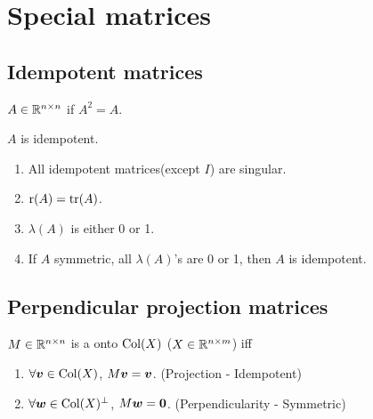 \documentclass[10pt,a4paper]{book}
\begin{document}
\section{Special matrices}\label{sec:spec_mat}
\subsection{Idempotent matrices}\label{sec:idempotent}
\begin{defbox}
	\begin{definition}\label{def:idempotent}
		$A\in\mathbb R^{n\times n}$ if $A^2=A$.  
	\end{definition}
\end{defbox}

\begin{thmbox}
	\begin{theorem}\label{thm:idempotent}
		$A$ is idempotent.  
		\begin{enumerate}
			\item All idempotent matrices(except $I$) are singular.
			\item $\mathrm{r}(A)=\mathrm{tr}(A)$. 
			\item $\lambda(A)$ is either 0 or 1. 
			\item If $A$ symmetric, all $\lambda(A)$'s are 0 or 1, then $A$ is idempotent. 
		\end{enumerate}
	\end{theorem}
\end{thmbox}

\subsection{Perpendicular projection matrices}\label{sec:ppm}
\begin{defbox}
	\begin{definition}\label{def:ppm}
		$M\in\mathbb R^{n\times n}$ is a  onto $\mathrm{Col}(X)$ ($X\in\mathbb R^{n\times m}$) iff 
		\begin{enumerate}
			\item $\forall {\boldsymbol v}\in\mathrm{Col}(X)$, $M{\boldsymbol v}={\boldsymbol v}$. (Projection - Idempotent)
			\item $\forall {\boldsymbol w}\in\mathrm{Col}(X)^{\perp}$, $M{\boldsymbol w}={\boldsymbol 0}$. (Perpendicularity - Symmetric)  
		\end{enumerate}  
	\end{definition}
\end{defbox}
\end{document}
